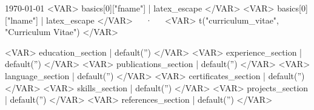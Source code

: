 \documentclass[11pt, a4paper]{./awesome-cv}
\begin{document}
\makecvheader

\makecvfooter
  {\today}
  {<VAR> basics[0]["fname"] | latex_escape </VAR> <VAR> basics[0]["lname"] | latex_escape </VAR>~~~·~~~<VAR> t("curriculum_vitae", "Curriculum Vitae") </VAR>}
  {\thepage}


<VAR> education_section    | default('') </VAR>
<VAR> experience_section    | default('') </VAR>
<VAR> publications_section    | default('') </VAR>
<VAR> language_section    | default('') </VAR>
<VAR> certificates_section    | default('') </VAR>
<VAR> skills_section    | default('') </VAR>
<VAR> projects_section    | default('') </VAR>
<VAR> references_section    | default('') </VAR>
\end{document}
